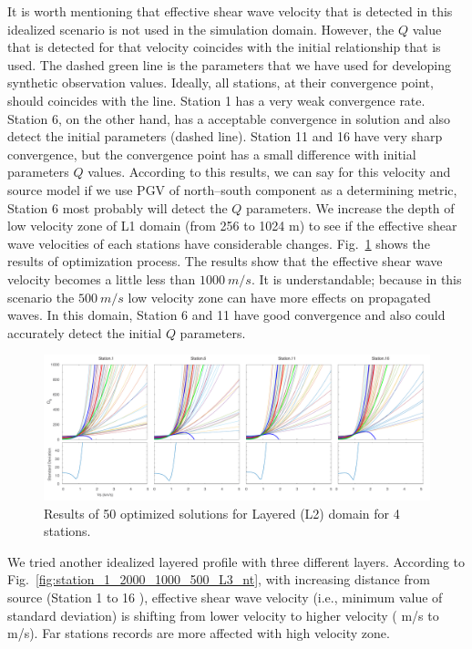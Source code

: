 It is worth mentioning that effective shear wave velocity that is detected in this idealized scenario is not used in the simulation domain. However, the $Q$ value that is detected for that velocity coincides with the initial \qsvs{} relationship that is used.  The dashed green line is the parameters that we have used for developing synthetic observation values. Ideally, all stations, at their convergence point, should coincides with the line. Station 1 has a very weak convergence rate. Station 6, on the other hand, has a acceptable convergence in solution and also detect the initial parameters (dashed line). Station 11 and 16 have very sharp convergence, but the convergence point has a small difference with initial parameters $Q$ values. According to this results, we can say for this velocity and source model if we use PGV of north--south component as a determining metric, Station 6 most probably will detect the $Q$ parameters.
We increase the depth of low velocity zone of L1 domain (from 256 to 1024 m) to see if the effective shear wave velocities of each stations have considerable changes. Fig.~\ref{fig:station_1_1000_500_2_L2} shows the results of optimization process. The results show that the effective shear wave velocity becomes a little less than $1000~m/s$. It is understandable; because in this scenario the $500~m/s$ low velocity zone can have more effects on propagated waves. In this domain, Station 6 and 11 have good convergence and also could accurately detect the initial $Q$ parameters. 

  \begin{figure}[ht]
    \centering
    \includegraphics[width=\textwidth]{figures/pdf/Figure_16-L2-pgv.pdf}
    \caption{Results of 50 optimized solutions for Layered (L2) domain for 4 stations.}
    \label{fig:station_1_1000_500_2_L2}
\end{figure}
 

We tried another idealized layered profile with three different layers. According to Fig.~\ref{fig:station_1_2000_1000_500_L3_nt}, with increasing distance from source (Station 1 to 16 ), effective shear wave velocity (i.e., minimum value of standard deviation) is shifting from lower velocity to higher velocity ( m/s to m/s). Far stations records are more affected with high velocity zone. 
 

